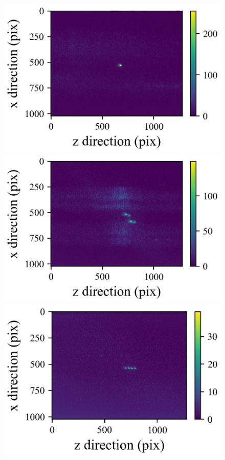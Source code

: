 \begin{figure}[h]
	\begin{center}
	\begin{minipage}{0.3\linewidth}
		\includegraphics[width=0.98\columnwidth]{./theory/figure/5/image_0.jpg}
	\end{minipage}
	\begin{minipage}{0.3\linewidth}
		\includegraphics[width=0.98\columnwidth]{./theory/figure/5/image_2.jpg}
	\end{minipage}
	\begin{minipage}{0.3\linewidth}
		\includegraphics[width=0.98\columnwidth]{./theory/figure/5/image_1.jpg}

\end{minipage}
\end{center}
\end{figure}
